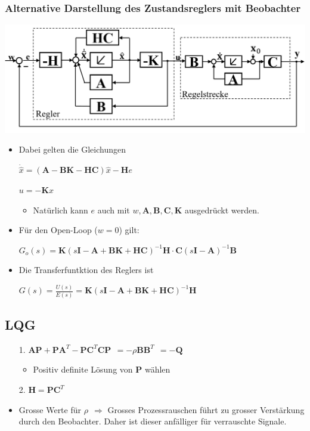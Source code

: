 \subsubsection{Alternative Darstellung des Zustandsreglers mit Beobachter}
\begin{center}
	\includegraphics[width=0.4\linewidth]{bilder/observer_alternativ}
\end{center}
\begin{itemize}
	\item Dabei gelten die Gleichungen
	\item[] $\dot{\hat{x}} = \left( \boldsymbol{A}-\boldsymbol{BK}-\boldsymbol{HC}\right)\hat{x}-\boldsymbol{H}e$
	\item[] $u = -\boldsymbol{K}\hat{x}$
	\begin{itemize}
		\item Natürlich kann $e$ auch mit $w,\boldsymbol{A},\boldsymbol{B},\boldsymbol{C},\boldsymbol{K}$ ausgedrückt werden.
	\end{itemize}
	\item Für den Open-Loop ($w=0$) gilt:
	\item [] $G_o(s) = \boldsymbol{K}\left( s\boldsymbol{I}-\boldsymbol{A}+\boldsymbol{BK}+\boldsymbol{HC}\right)^{-1}\boldsymbol{H} \cdot\boldsymbol{C}\left(s\boldsymbol{I}-\boldsymbol{A}\right)^{-1}\boldsymbol{B}$
	\item Die Transferfuntktion des Reglers ist
	\item[] $G(s) = \frac{U(s)}{E(s)} = 
	\boldsymbol{K}\left( s\boldsymbol{I}-\boldsymbol{A}+\boldsymbol{BK}+\boldsymbol{HC}\right)^{-1}\boldsymbol{H}$
\end{itemize}

\subsection{LQG}
\begin{itemize}
	\item [1.] $\boldsymbol{AP}+\boldsymbol{PA}^T-\boldsymbol{PC}^T\boldsymbol{CP} ~~=-\rho\boldsymbol{BB}^T ~~=-\boldsymbol{Q}$
	\begin{itemize}
		\item Positiv definite Lösung von $\boldsymbol{P}$ wählen
	\end{itemize}
	\item [2.] $\boldsymbol{H} =\boldsymbol{PC}^T$
	\item Grosse Werte für $\rho ~~\Rightarrow$ Grosses Prozessrauschen führt zu grosser Verstärkung durch den Beobachter. Daher ist dieser anfälliger für verrauschte Signale.
\end{itemize}


